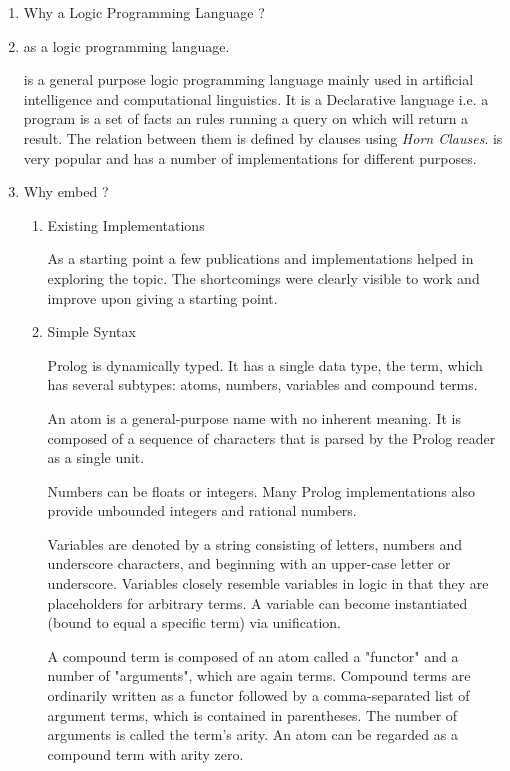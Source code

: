 \documentclass[thesis-solanki.tex]{subfiles}
\begin{document}
\begin{enumerate}
\item Why a Logic Programming Language ?

\item {} as a logic programming language.

 is a general purpose logic programming language mainly used in artificial intelligence and computational linguistics.  
It is a Declarative language i.e. a program is a set of facts an rules running a query on which will return a result. The relation
between them is defined by clauses using \textit{Horn Clauses}\cite{wikiprolog}.  is very popular and has a number of 
implementations \cite{website:comparisonofprologimplementationswiki} for different purposes. 

\item Why embed  ?

\begin{enumerate}


\item Existing Implementations

As a starting point a few publications and implementations helped in exploring the topic. The shortcomings were clearly visible to work and
improve upon giving a starting point.

\item Simple Syntax
\cite{wikiprolog}

Prolog is dynamically typed. It has a single data type, the term, which has several subtypes: atoms, numbers, variables and compound terms.

An atom is a general-purpose name with no inherent meaning. It is composed of a sequence of characters that is parsed by the Prolog reader 
as a single unit.

Numbers can be floats or integers. Many Prolog implementations also provide unbounded integers and rational numbers.

Variables are denoted by a string consisting of letters, numbers and underscore characters, and beginning with an upper-case letter or 
underscore. Variables closely resemble variables in logic in that they are placeholders for arbitrary terms. A variable can become 
instantiated (bound to equal a specific term) via unification.

A compound term is composed of an atom called a "functor" and a number of "arguments", which are again terms. Compound terms are ordinarily 
written as a functor followed by a comma-separated list of argument terms, which is contained in parentheses. The number of arguments is 
called the term's arity. An atom can be regarded as a compound term with arity zero.


\end{enumerate}
\end{enumerate}
\end{document}
